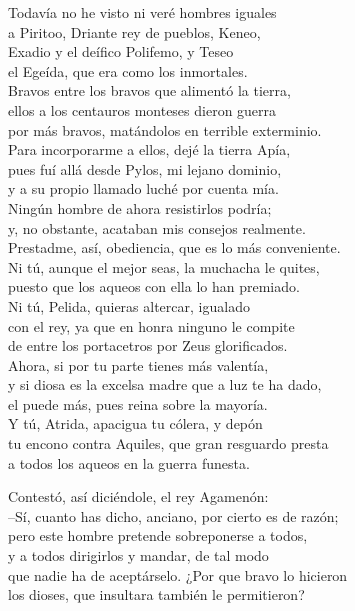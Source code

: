 Todavía no he visto ni veré hombres iguales\\
a Piritoo, Driante rey de pueblos, Keneo,\\
Exadio y el deífico Polifemo, y Teseo\\
el Egeída, que era como los inmortales.\\
Bravos entre los bravos que alimentó la tierra,\\
ellos a los centauros monteses dieron guerra\\
por más bravos, matándolos en terrible exterminio.\\
Para incorporarme a ellos, dejé la tierra Apía,\\
pues fuí allá desde Pylos, mi lejano dominio,\\
y a su propio llamado luché por cuenta mía.\\
Ningún hombre de ahora resistirlos podría;\\
y, no obstante, acataban mis consejos realmente.\\
Prestadme, así, obediencia, que es lo más conveniente.\\
Ni tú, aunque el mejor seas, la muchacha le quites,\\
puesto que los aqueos con ella lo han premiado.\\
Ni tú, Pelida, quieras altercar, igualado\\
con el rey, ya que en honra ninguno le compite\\
de entre los portacetros por Zeus glorificados.\\
Ahora, si por tu parte tienes más valentía,\\
y si diosa es la excelsa madre que a luz te ha dado,\\
el puede más, pues reina sobre la mayoría.\\
Y tú, Atrida, apacigua tu cólera, y depón\\
tu encono contra Aquiles, que gran resguardo presta\\
a todos los aqueos en la guerra funesta.\par
Contestó, así diciéndole, el rey Agamenón:\\
--Sí, cuanto has dicho, anciano, por cierto es de razón;\\
pero este hombre pretende sobreponerse a todos,\\
y a todos dirigirlos y mandar, de tal modo\\
que nadie ha de aceptárselo. ¿Por que bravo lo hicieron\\
los dioses, que insultara también le permitieron?\par
